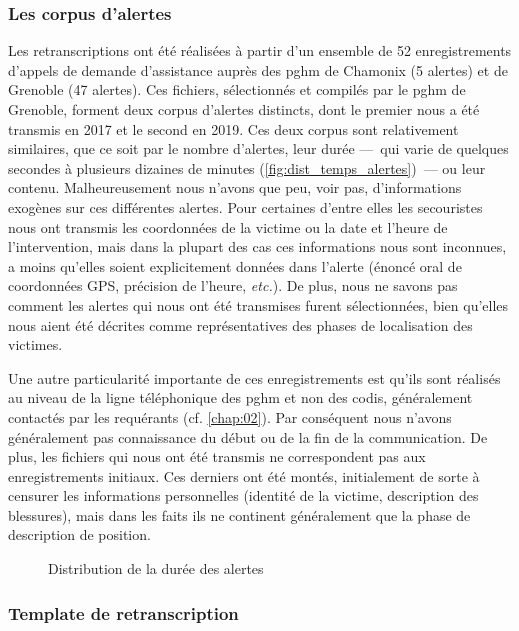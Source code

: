 \subsubsection{Les corpus d'alertes}

Les retranscriptions ont été réalisées à partir d'un ensemble de 52
enregistrements d'appels de demande d'assistance auprès des \ac{pghm}
de Chamonix (5 alertes) et de Grenoble (47 alertes). Ces fichiers,
sélectionnés et compilés par le \ac{pghm} de Grenoble, forment deux
corpus d'alertes distincts, dont le premier nous a été transmis en
2017 et le second en 2019. Ces deux corpus sont relativement
similaires, que ce soit par le nombre d'alertes, leur durée ---~qui
varie de quelques secondes à plusieurs dizaines de minutes
(\autoref{fig:dist_temps_alertes})~--- ou leur
contenu. Malheureusement nous n'avons que peu, voir pas,
d'informations exogènes sur ces différentes alertes. Pour certaines
d'entre elles les secouristes nous ont transmis les coordonnées de la
victime ou la date et l'heure de l'intervention, mais dans la plupart
des cas ces informations nous sont inconnues, a moins qu'elles soient
explicitement données dans l'alerte (\eg énoncé oral de coordonnées
GPS, précision de l'heure, \emph{etc.}). De plus, nous ne savons pas
comment les alertes qui nous ont été transmises furent sélectionnées,
bien qu'elles nous aient été décrites comme représentatives des phases
de localisation des victimes.

Une autre particularité importante de ces enregistrements est qu'ils
sont réalisés au niveau de la ligne téléphonique des \ac{pghm} et non
des \ac{codis}, généralement contactés par les requérants
(cf. \autoref{chap:02}). Par conséquent nous n'avons généralement pas
connaissance du début ou de la fin de la communication. De plus, les
fichiers qui nous ont été transmis ne correspondent pas aux
enregistrements initiaux. Ces derniers ont été montés, initialement de
sorte à censurer les informations personnelles (\eg identité de la
victime, description des blessures), mais dans les faits ils ne
continent généralement que la phase de description de position.

\begin{figure}
  \centering
  
  \caption{Distribution de la durée des alertes}
  \label{fig:dist_temps_alertes}
\end{figure}

\subsubsection{Template de retranscription}


